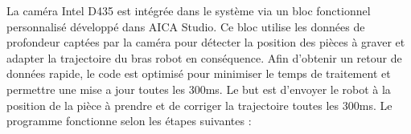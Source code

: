 La caméra Intel D435 est intégrée dans le système via un bloc fonctionnel personnalisé développé dans AICA Studio. Ce bloc utilise les données de profondeur captées par la caméra pour détecter la position des pièces à graver et adapter la trajectoire du bras robot en conséquence.
Afin d'obtenir un retour de données rapide, le code est optimisé pour minimiser le temps de traitement et permettre une mise a jour toutes les 300ms. Le but est d'envoyer le robot à la position de la pièce à prendre et de corriger la trajectoire toutes les 300ms.
Le programme fonctionne selon les étapes suivantes :
\begin{figure}[H]
    \centering
    \begin{minipage}{0.55\textwidth}
        \centering
        \begin{tikzpicture}[node distance=1.8cm, every node/.style={draw, align=center, rounded corners, minimum height=1cm}]


\end{tikzpicture}
\end{minipage}
\end{figure}
